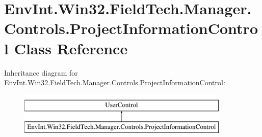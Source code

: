 \hypertarget{class_env_int_1_1_win32_1_1_field_tech_1_1_manager_1_1_controls_1_1_project_information_control}{}\section{Env\+Int.\+Win32.\+Field\+Tech.\+Manager.\+Controls.\+Project\+Information\+Control Class Reference}
\label{class_env_int_1_1_win32_1_1_field_tech_1_1_manager_1_1_controls_1_1_project_information_control}
Inheritance diagram for Env\+Int.\+Win32.\+Field\+Tech.\+Manager.\+Controls.\+Project\+Information\+Control\+:\begin{figure}[H]
\begin{center}
\leavevmode
\includegraphics[height=2.000000cm]{class_env_int_1_1_win32_1_1_field_tech_1_1_manager_1_1_controls_1_1_project_information_control}
\end{center}
\end{figure}
